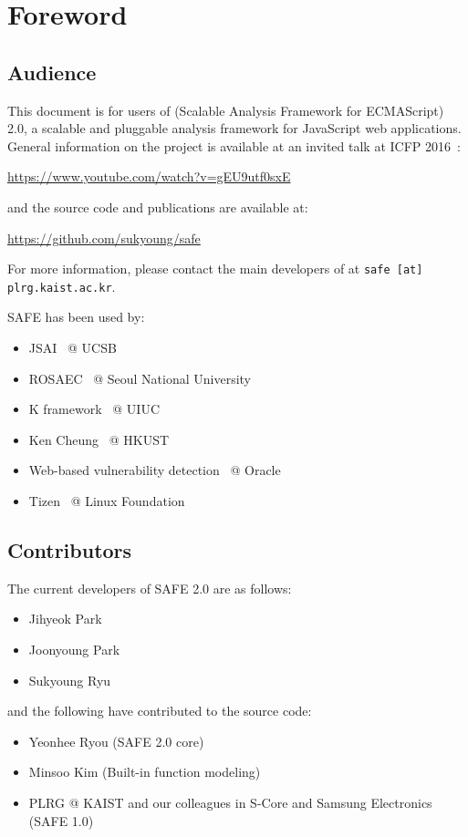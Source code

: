 \chapter{Foreword}
\label{c:1:foreword}

\section{Audience}
This document is for users of \safe (Scalable Analysis Framework for ECMAScript)
2.0, a scalable and pluggable analysis framework for JavaScript web applications.
General information on the \safe project is available at an invited talk at ICFP 2016~\cite{safeicfp16}:
\begin{center}
  \url{https://www.youtube.com/watch?v=gEU9utf0sxE}
\end{center}
and the source code and publications are available at:
\begin{center}
  \url{https://github.com/sukyoung/safe}
\end{center}
For more information, please contact the main developers of \safe
at \texttt{safe [at] plrg.kaist.ac.kr}.

SAFE has been used by:
\begin{itemize}
\itemsep-.1em
\item JSAI~\cite{jsai} @ UCSB
\item ROSAEC~\cite{rosaec} @ Seoul National University
\item K framework~\cite{kjs} @ UIUC
\item Ken Cheung~\cite{emse16} @ HKUST
\item Web-based vulnerability detection~\cite{oracle} @ Oracle
\item Tizen~\cite{tizen} @ Linux Foundation
\end{itemize}

\section{Contributors}
The current developers of SAFE 2.0 are as follows:
\begin{itemize}
\itemsep-.1em
\item Jihyeok Park
\item Joonyoung Park
\item Sukyoung Ryu
\end{itemize}
and the following have contributed to the source code:
\begin{itemize}
\itemsep-.1em
\item Yeonhee Ryou (SAFE 2.0 core)
\item Minsoo Kim (Built-in function modeling)
\item PLRG @ KAIST and our colleagues in S-Core and Samsung Electronics (SAFE 1.0)
\end{itemize}


